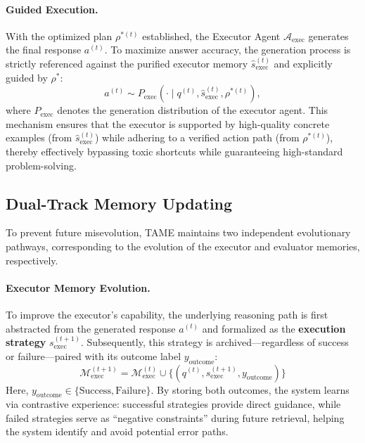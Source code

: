 \documentclass{article}
\theoremstyle{plain}
\theoremstyle{definition}
\theoremstyle{remark}
\begin{document}
\paragraph{Guided Execution.} With the optimized plan $\rho^{*(t)}$ established, the Executor Agent $\mathcal{A}_{\text{exec}}$ generates the final response $a^{(t)}$. To maximize answer accuracy, the generation process is strictly referenced against the purified executor memory $\hat{s}_{\text{exec}}^{(t)}$ and explicitly guided by $\rho^*$:
\begin{equation}
    a^{(t)} \sim P_{\text{exec}}(\cdot \mid q^{(t)}, \hat{s}_{\text{exec}}^{(t)}, \rho^{*(t)}),
\end{equation}
where $P_{\text{exec}}$ denotes the generation distribution of the executor agent. This mechanism ensures that the executor is supported by high-quality concrete examples (from $\hat{s}_{\text{exec}}^{(t)}$) while adhering to a verified action path (from $\rho^{*(t)}$), thereby effectively bypassing toxic shortcuts while guaranteeing high-standard problem-solving.

\subsection{Dual-Track Memory Updating}
To prevent future misevolution, TAME maintains two independent evolutionary pathways, corresponding to the evolution of the executor and evaluator memories, respectively.

\paragraph{Executor Memory Evolution.} To improve the executor’s capability, the underlying reasoning path is first abstracted from the generated response $a^{(t)}$ and formalized as the \textbf{execution strategy} $s_{\text{exec}}^{(t+1)}$. Subsequently, this strategy is archived---regardless of success or failure---paired with its outcome label $y_{\text{outcome}}$:
\begin{equation}
    \mathcal{M}_{\text{exec}}^{(t+1)} = \mathcal{M}_{\text{exec}}^{(t)} \cup \big\{ (q^{(t)}, s_{\text{exec}}^{(t+1)}, y_{\text{outcome}}) \big\}
\end{equation}
Here, $y_{\text{outcome}} \in \{\text{Success}, \text{Failure}\}$. By storing both outcomes, the system learns via contrastive experience: successful strategies provide direct guidance, while failed strategies serve as ``negative constraints'' during future retrieval, helping the system identify and avoid potential error paths.
\end{document}
